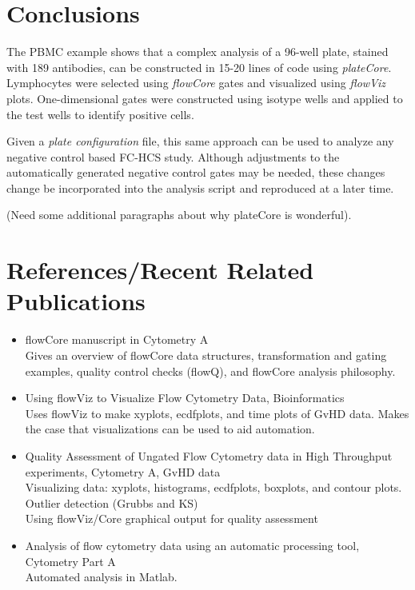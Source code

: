 \documentclass[12pt]{article}
\newcommand{\Rpackage}[1]{{\textit{#1}}}
\begin{document}
\clearpage
\section{Conclusions}

The PBMC example shows that a complex analysis of a 96-well plate, stained with 189 antibodies,
can be constructed in 15-20 lines of code using \Rpackage{plateCore}. Lymphocytes were selected
using \Rpackage{flowCore} gates and visualized using \Rpackage{flowViz} plots. One-dimensional 
gates were constructed using isotype wells and applied to the test wells to identify positive cells.

Given a \textit{plate configuration} file, this same approach can be used to analyze any
negative control based FC-HCS study. Although adjustments to the automatically generated negative control gates may be needed,
these changes change be incorporated into the analysis script and reproduced at a later time.

(Need some additional paragraphs about why plateCore is wonderful).

\section{References/Recent Related Publications}
\begin{itemize}
\item flowCore manuscript in Cytometry A\\
Gives an overview of flowCore data structures, transformation and gating examples, quality control checks (flowQ), and 
flowCore analysis philosophy.\\
\item Using flowViz to Visualize Flow Cytometry Data, Bioinformatics\\
Uses flowViz to make xyplots, ecdfplots, and time plots of GvHD data. Makes the case that visualizations can be used to aid automation.
\item Quality Assessment of Ungated Flow Cytometry data in High Throughput experiments, Cytometry A, GvHD data\\
Visualizing data: xyplots, histograms, ecdfplots, boxplots, and contour plots.\\
Outlier detection (Grubbs and KS)\\
Using flowViz/Core graphical output for quality assessment\\
\item Analysis of flow cytometry data using an automatic processing tool, Cytometry Part A\\
Automated analysis in Matlab.\\
\end{itemize}
\end{document}
